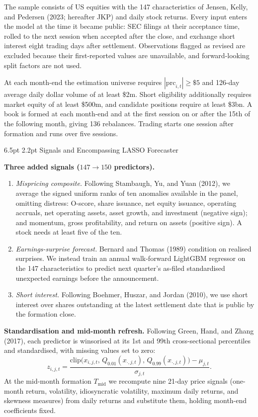 \documentclass[10pt,twocolumn,letterpaper]{article}
\makeatletter
\renewcommand{\section}{\@startsection{section}{1}{\z@}%
  {6.5pt \@plus 2pt \@minus 1pt}%
  {2.2pt}%
  {\normalfont\normalsize\bfseries}}
\makeatother
\begin{document}
The sample consists of US equities with the 147 characteristics of Jensen, Kelly, and Pedersen (2023; hereafter JKP) and daily stock returns. Every input enters the model at the time it became public: SEC filings at their acceptance time, rolled to the next session when accepted after the close, and exchange short interest eight trading days after settlement. Observations flagged as revised are excluded because their first-reported values are unavailable, and forward-looking split factors are not used.

At each month-end the estimation universe requires $|\mathrm{prc}_{i,t}| \ge \$5$ and 126-day average daily dollar volume of at least \$2m. Short eligibility additionally requires market equity of at least \$500m, and candidate positions require at least \$3bn. A book is formed at each month-end and at the first session on or after the 15th of the following month, giving 136 rebalances. Trading starts one session after formation and runs over five sessions.

\section{Signals and Encompassing LASSO Forecaster}

\textbf{Three added signals ($147 \to 150$ predictors).}
\begin{enumerate}
\item \textit{Mispricing composite.} Following Stambaugh, Yu, and Yuan (2012), we average the signed uniform ranks of ten anomalies available in the panel, omitting distress: O-score, share issuance, net equity issuance, operating accruals, net operating assets, asset growth, and investment (negative sign); and momentum, gross profitability, and return on assets (positive sign). A stock needs at least five of the ten.
\item \textit{Earnings-surprise forecast.} Bernard and Thomas (1989) condition on realised surprises. We instead train an annual walk-forward LightGBM regressor on the 147 characteristics to predict next quarter's as-filed standardised unexpected earnings before the announcement.
\item \textit{Short interest.} Following Boehmer, Huszar, and Jordan (2010), we use short interest over shares outstanding at the latest settlement date that is public by the formation close.
\end{enumerate}

\textbf{Standardisation and mid-month refresh.} Following Green, Hand, and Zhang (2017), each predictor is winsorised at its 1st and 99th cross-sectional percentiles and standardised, with missing values set to zero:
\begin{equation}
z_{i,j,t} = \frac{\mathrm{clip}\big(x_{i,j,t},\, Q_{0.01}(x_{\cdot,j,t}),\, Q_{0.99}(x_{\cdot,j,t})\big) - \mu_{j,t}}{\sigma_{j,t}}. \label{eq:ghz}
\end{equation}
At the mid-month formation $T_{\text{mid}}$ we recompute nine 21-day price signals (one-month return, volatility, idiosyncratic volatility, maximum daily returns, and skewness measures) from daily returns and substitute them, holding month-end coefficients fixed.
\end{document}
